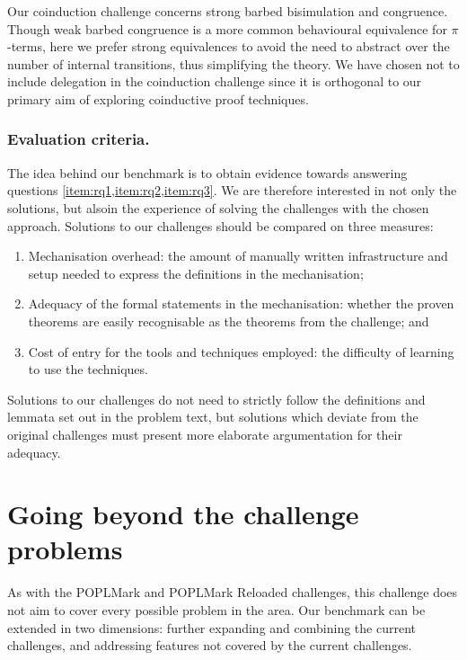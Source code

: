 \documentclass[runningheads]{llncs}
\begin{document}
Our coinduction challenge concerns strong barbed bisimulation and congruence.
Though weak barbed congruence is a more common behavioural equivalence for \(\pi\)-terms, here we prefer strong equivalences to avoid the need to abstract over the number of internal transitions, %
thus simplifying the theory.
We have chosen not to include delegation in the coinduction challenge since it is orthogonal to our primary aim of exploring coinductive proof techniques.

\subsubsection{Evaluation criteria.}
The idea behind our benchmark is to obtain evidence towards answering questions \cref{item:rq1,item:rq2,item:rq3}. We are therefore interested in not only the solutions, but alsoin the experience of solving the challenges with the chosen approach.
Solutions to our challenges should be compared on three measures:
\begin{enumerate}
\item Mechanisation overhead: the amount of manually written infrastructure and setup needed to express the definitions in the mechanisation;
\item Adequacy of the formal statements in the mechanisation: whether the proven theorems are easily recognisable as the theorems from the challenge; and
\item Cost of entry for the tools and techniques employed: the difficulty of learning to use the techniques.
\end{enumerate}
Solutions to our challenges do not need to strictly follow the definitions and lemmata set out in the problem text, but solutions which deviate from the original challenges must present more elaborate argumentation for their adequacy.

\section{Going beyond the challenge problems}\label{sec:going-beyond}

As with the POPLMark and POPLMark Reloaded challenges, this challenge does not aim to cover every possible
problem in the area. Our benchmark can be extended in two
dimensions: further expanding and combining the current challenges,
and addressing features not covered by the current challenges.

\vspace{-1mm}%
\end{document}
